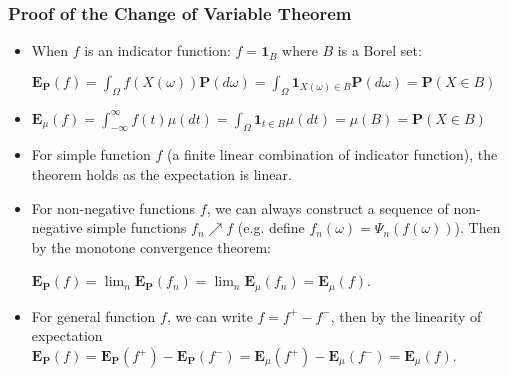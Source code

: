 \documentclass[handout]{beamer}
\newcommand{\BP}{\mathbf{P}}
\newcommand{\BE}{\mathbf{E}}
\newcommand{\BI}{\mathbf{1}}
\begin{document}
\frame
{
  \frametitle{Proof of the Change of Variable Theorem}

   \begin{itemize}
  
                \item<1->[1)] When $f$ is an indicator function: $f=\BI_B$ where $B$ is a Borel set: 
                
                $\BE_{\BP} (f)=  \int_{\Omega} f(X(\omega) )\mathbf{P} (d\omega)=\int_{\Omega} \BI_{X(\omega) \in B} \mathbf{P} (d\omega)=\BP(X\in B)$                
                \item<2->[]    $\BE_{\mu}(f) = \int_{-\infty}^{\infty} f(t) \mu(dt) =\int_{\Omega} \BI_{t \in B} \mu(dt)=\mu(B)=\BP(X\in B)$

                             
               \item<3->[2)] For simple function $f$ (a finite linear combination of indicator function), the theorem holds as the expectation is linear.     
               
                              \item<4->[3)] For non-negative functions $f$, we can always construct a sequence of non-negative simple functions $f_n\nearrow f$ (e.g. define $f_n(\omega) = \Psi_n(f(\omega))$). Then by the monotone convergence theorem: 
                              
                              $\BE_{\BP} (f) =\lim_n \BE_{\BP} (f_n)=\lim_n \BE_{\mu} (f_n) =\BE_{\mu} (f)$.
                              
               
                              \item<4->[4)] For general function $f$, we can write $f=f^+-f^-$, then by the linearity of expectation                              
                              $\BE_{\BP} (f) =\BE_{\BP} (f^+)- \BE_{\BP} (f^-)=\BE_{\mu} (f^+)- \BE_{\mu} (f^-)=\BE_{\mu} (f)$.
                                                      
\end{itemize}
}
\end{document}
